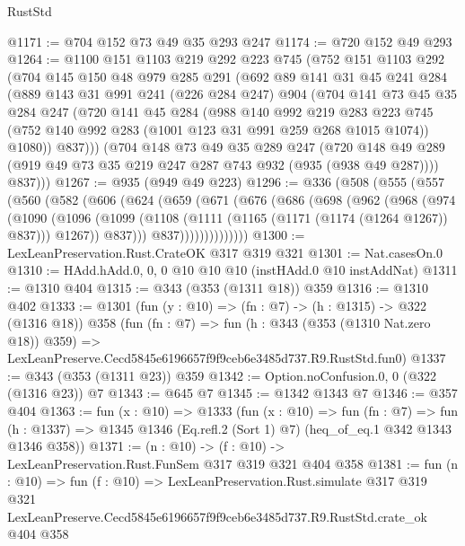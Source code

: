 \begin{lexlean}{RustStd}
\begin{coremodule}
@1171 := @704 @152 @73 @49 @35 @293 @247
@1174 := @720 @152 @49 @293
@1264 := @1100
    @151
    @1103
    @219
    @292
    @223
    @745
    (@752
      @151
      @1103
      @292
      (@704
        @145
        @150
        @48
        @979
        @285
        @291
        (@692
          @89
          @141
          @31
          @45
          @241
          @284
          (@889
            @143
            @31
            @991
            @241
            (@226 @284 @247)
            @904
            (@704
              @141
              @73
              @45
              @35
              @284
              @247
              (@720
                @141
                @45
                @284
                (@988
                  @140
                  @992
                  @219
                  @283
                  @223
                  @745
                  (@752 @140 @992 @283 (@1001 @123 @31 @991 @259 @268 @1015 @1074))
                  @1080))
              @837)))
        (@704
          @148
          @73
          @49
          @35
          @289
          @247
          (@720 @148 @49 @289 (@919 @49 @73 @35 @219 @247 @287 @743 @932 (@935 (@938 @49 @287))))
          @837)))
@1267 := @935 (@949 @49 @223)
@1296 := @336
    (@508
      (@555
        (@557
          (@560
            (@582
              (@606
                (@624
                  (@659
                    (@671
                      (@676
                        (@686
                          (@698
                            (@962
                              (@968
                                (@974
                                  (@1090
                                    (@1096
                                      (@1099
                                        (@1108
                                          (@1111 (@1165 (@1171 (@1174 (@1264 @1267)) @837)))
                                          @1267))
                                      @837)))
                                @837))))))))))))))
@1300 := LexLeanPreservation.Rust.CrateOK @317 @319 @321
@1301 := Nat.casesOn.{0}
@1310 := HAdd.hAdd.{0, 0, 0} @10 @10 @10 (instHAdd.{0} @10 instAddNat)
@1311 := @1310 @404
@1315 := @343 (@353 (@1311 @18)) @359
@1316 := @1310 @402
@1333 := @1301
    (fun (y : @10) => (fn : @7) -> (h : @1315) -> @322 (@1316 @18))
    @358
    (fun (fn : @7) =>
    fun (h : @343 (@353 (@1310 Nat.zero @18)) @359) =>
    LexLeanPreserve.Cecd5845e6196657f9f9ceb6e3485d737.R9.RustStd.fun0)
@1337 := @343 (@353 (@1311 @23)) @359
@1342 := Option.noConfusion.{0, 0} (@322 (@1316 @23)) @7
@1343 := @645 @7
@1345 := @1342 @1343 @7
@1346 := @357 @404
@1363 := fun (x : @10) =>
  @1333
    (fun (x : @10) =>
    fun (fn : @7) =>
    fun (h : @1337) => @1345 @1346 (Eq.refl.{2} (Sort 1) @7) (heq_of_eq.{1} @342 @1343 @1346 @358))
@1371 := (n : @10) -> (f : @10) -> LexLeanPreservation.Rust.FunSem @317 @319 @321 @404 @358
@1381 := fun (n : @10) =>
  fun (f : @10) =>
  LexLeanPreservation.Rust.simulate
    @317
    @319
    @321
    LexLeanPreserve.Cecd5845e6196657f9f9ceb6e3485d737.R9.RustStd.crate_ok
    @404
    @358
\end{coremodule}
\end{lexlean}
